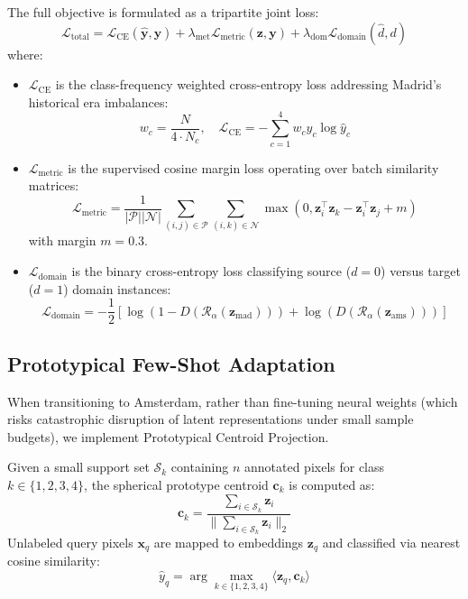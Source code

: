 \documentclass[11pt,a4paper]{article}
\begin{document}
The full objective is formulated as a tripartite joint loss:
\begin{equation}
    \mathcal{L}_{\text{total}} = \mathcal{L}_{\text{CE}}(\hat{\mathbf{y}}, \mathbf{y}) + \lambda_{\text{met}} \mathcal{L}_{\text{metric}}(\mathbf{z}, \mathbf{y}) + \lambda_{\text{dom}} \mathcal{L}_{\text{domain}}(\hat{d}, d)
\end{equation}
where:
\begin{itemize}
    \item $\mathcal{L}_{\text{CE}}$ is the class-frequency weighted cross-entropy loss addressing Madrid's historical era imbalances:
    \begin{equation}
        w_c = \frac{N}{4 \cdot N_c}, \quad \mathcal{L}_{\text{CE}} = -\sum_{c=1}^4 w_c y_c \log \hat{y}_c
    \end{equation}
    \item $\mathcal{L}_{\text{metric}}$ is the supervised cosine margin loss operating over batch similarity matrices:
    \begin{equation}
        \mathcal{L}_{\text{metric}} = \frac{1}{|\mathcal{P}||\mathcal{N}|} \sum_{(i,j) \in \mathcal{P}} \sum_{(i,k) \in \mathcal{N}} \max\left(0, \mathbf{z}_i^\top \mathbf{z}_k - \mathbf{z}_i^\top \mathbf{z}_j + m\right)
    \end{equation}
    with margin $m = 0.3$.
    \item $\mathcal{L}_{\text{domain}}$ is the binary cross-entropy loss classifying source ($d=0$) versus target ($d=1$) domain instances:
    \begin{equation}
        \mathcal{L}_{\text{domain}} = -\frac{1}{2}\left[\log(1 - D(\mathcal{R}_\alpha(\mathbf{z}_{\text{mad}}))) + \log(D(\mathcal{R}_\alpha(\mathbf{z}_{\text{ams}})))\right]
    \end{equation}
\end{itemize}

\subsection{Prototypical Few-Shot Adaptation}
When transitioning to Amsterdam, rather than fine-tuning neural weights (which risks catastrophic disruption of latent representations under small sample budgets), we implement Prototypical Centroid Projection. 

Given a small support set $\mathcal{S}_k$ containing $n$ annotated pixels for class $k \in \{1, 2, 3, 4\}$, the spherical prototype centroid $\mathbf{c}_k$ is computed as:
\begin{equation}
    \mathbf{c}_k = \frac{\sum_{i \in \mathcal{S}_k} \mathbf{z}_i}{\|\sum_{i \in \mathcal{S}_k} \mathbf{z}_i\|_2}
\end{equation}
Unlabeled query pixels $\mathbf{x}_q$ are mapped to embeddings $\mathbf{z}_q$ and classified via nearest cosine similarity:
\begin{equation}
    \hat{y}_q = \arg\max_{k \in \{1,2,3,4\}} \langle \mathbf{z}_q, \mathbf{c}_k \rangle
\end{equation}
\end{document}
